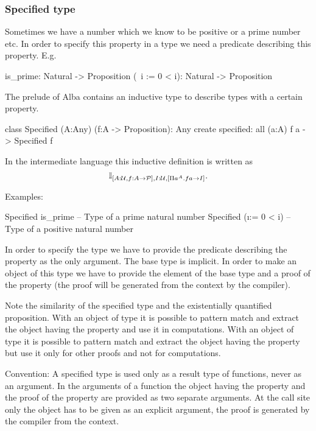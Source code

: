 \subsubsection{Specified type}


Sometimes we have a number which we know to be positive or a prime number
etc. In order to specify this property in a type we need a predicate
describing this property. E.g.

\begin{alba}
  is_prime:       Natural -> Proposition
  (\ i := 0 < i): Natural -> Proposition
\end{alba}

The prelude of Alba contains an inductive type to describe types with a
certain property.

\begin{alba}
  class
     Specified (A:Any) (f:A -> Proposition): Any
  create
     specified: all (a:A) f a -> Specified f
\end{alba}

In the intermediate language this inductive definition is written as
$$
\mathbb{I}_{[A:{\cal{U}}, f:A \to {\cal{P}}], I:{\cal{U}}, [\Pi a^A . f a \to I]}.
$$

\noindent Examples:
\begin{alba}
  Specified is_prime       -- Type of a prime natural number
  Specified (\i := 0 < i)  -- Type of a positive natural number
\end{alba}

In order to specify the type we have to provide the predicate describing the
property as the only argument. The base type is implicit. In order to make an
object of this type we have to provide the element of the base type and a
proof of the property (the proof will be generated from the context by the
compiler).

Note the similarity of the specified type and the existentially quantified
proposition. With an object of type  it is possible
to pattern match and extract the object having the property and use it in
computations. With an object of type  it is possible to
pattern match and extract the object having the property but use it only for
other proofs and not for computations.

Convention: A specified type is used only as a result type of functions, never
as an argument. In the arguments of a function the object having the property
and the proof of the property are provided as two separate arguments. At the
call site only the object has to be given as an explicit argument, the proof
is generated by the compiler from the context.
\newline





